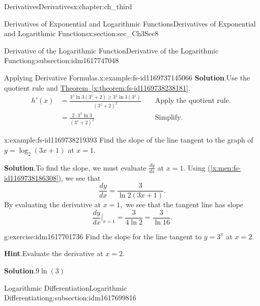 \documentclass[oneside,10pt,]{book}
\newcommand{\blocktitlefont}{\relax}
\newcommand{\xreffont}{\relax}
\numberwithin{equation}{section}
\newcommand{\amp}{&}
\begin{document}
\begin{chapterptx}{Derivatives}{}{Derivatives}{}{}{x:chapter:ch_third}
\begin{sectionptx}{Derivatives of Exponential and Logarithmic Functions}{}{Derivatives of Exponential and Logarithmic Functions}{}{}{x:section:sec_Ch3Sec8}
\begin{subsectionptx}{Derivative of the Logarithmic Function}{}{Derivative of the Logarithmic Function}{}{}{g:subsection:idm1617747048}
\begin{example}{Applying Derivative Formulas.}{x:example:fs-id1169737145066}
\noindent\textbf{\blocktitlefont Solution}.\hypertarget{g:solution:idm1617706216}{}\quad{}Use the quotient rule and \hyperref[x:theorem:fs-id1169738238181]{Theorem~{\xreffont\ref{x:theorem:fs-id1169738238181}}}.%
%
\begin{align*}
h'(x)\amp=\frac{3^x \ln  3(3^x+2)\geq 3^x \ln  3(3^x)}{(3^x+2)^2}\amp\amp\text{ Apply the quotient rule. }\\
\amp=\frac{2\cdot 3^x \ln  3}{(3^x+2)^2}\amp\amp\text{ Simplify. }
\end{align*}
\end{example}
\begin{example}{}{x:example:fs-id1169738219393}%
Find the slope of the line tangent to the graph of \(y=\log_{2} (3x+1)\) at \(x=1.\)%
\par\smallskip%
\noindent\textbf{\blocktitlefont Solution}.\hypertarget{g:solution:idm1617702760}{}\quad{}To find the slope, we must evaluate \(\frac{dy}{dx}\) at \(x=1.\) Using \hyperref[x:men:fs-id1169738186308]{({\xreffont\ref{x:men:fs-id1169738186308}})}, we see that%
%
\begin{equation*}
\frac{dy}{dx}=\frac{3}{ \ln  2(3x+1)}.
\end{equation*}
By evaluating the derivative at \(x=1,\) we see that the tangent line has slope%
%
\begin{equation*}
\frac{dy}{dx}|_{x=1}=\frac{3}{4 \ln  2}=\frac{3}{ \ln  16}.
\end{equation*}
\end{example}
\begin{inlineexercise}{}{g:exercise:idm1617701736}%
Find the slope for the line tangent to \(y=3^x\) at \(x=2.\)%
\par\smallskip%
\noindent\textbf{\blocktitlefont Hint}.\hypertarget{g:hint:idm1617697896}{}\quad{}Evaluate the derivative at \(x=2.\)%
\par\smallskip%
\noindent\textbf{\blocktitlefont Solution}.\hypertarget{g:solution:idm1617698536}{}\quad{}\(9 \ln  (3)\)%
\end{inlineexercise}%
\end{subsectionptx}
%
%
\typeout{************************************************}
\typeout{************************************************}
%
\begin{subsectionptx}{Logarithmic Differentiation}{}{Logarithmic Differentiation}{}{}{g:subsection:idm1617699816}

\end{subsectionptx}
\end{sectionptx}
\end{chapterptx}
\end{document}

